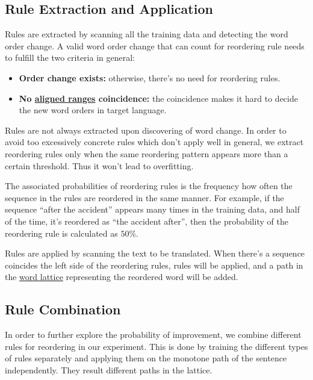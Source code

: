 \subsection{Rule Extraction and Application}
\label{general}

Rules are extracted by scanning all the training data and detecting the word order change. A valid word order change that can count for reordering rule needs to fulfill the two criteria in general:
\begin{itemize}
\setlength{\itemsep}{0cm}%
\setlength{\parskip}{0cm}%
\item \textbf{Order change exists:} otherwise, there's no need for reordering rules.
\item \textbf{No \hyperref[alignedrange]{aligned ranges} coincidence:} the coincidence makes it hard to decide the new word orders in target language.
\end{itemize}

Rules are not always extracted upon discovering of word change. In order to avoid too excessively concrete rules which don't apply well in general, we extract reordering rules only when the same reordering pattern appears more than a certain threshold. Thus it won't lead to overfitting.

The associated probabilities of reordering rules is the frequency how often the sequence in the rules are reordered in the same manner. For example, if the sequence ``after the accident'' appears many times in the training data, and half of the time, it's reordered as ``the accident after'', then the probability of the reordering rule is calculated as $50\%$.

Rules are applied by scanning the text to be translated. When there's a sequence coincides the left side of the reordering rules, rules will be applied, and a path in the \hyperref[ch:Foundations:sec:Lattices]{word lattice} representing the reordered word will be added.

\subsection{Rule Combination}

In order to further explore the probability of improvement, we combine different rules for reordering in our experiment. This is done by training the different types of rules separately and applying them on the monotone path of the sentence independently. They result different paths in the lattice.



